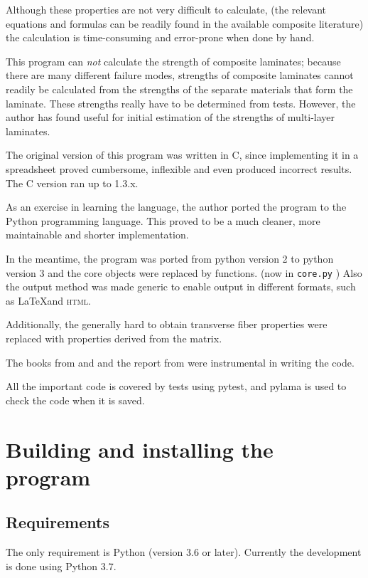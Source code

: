 \documentclass[a4paper,landscape,oneside,11pt,twocolumn]{memoir}
\begin{document}
Although these properties are not very difficult to calculate, (the relevant
equations and formulas can be readily found in the available composite
literature) the calculation is time-consuming and error-prone when done by
hand.

This program can \emph{not} calculate the strength of composite laminates;
because there are many different failure modes, strengths of composite
laminates cannot readily be calculated from the strengths of the separate
materials that form the laminate. These strengths really have to be determined from
tests. However, the author has found \citet{1992WeiEn..52...29H} useful for
initial estimation of the strengths of multi-layer laminates.

The original version of this program was written in C, since implementing
it in a spreadsheet proved cumbersome, inflexible and even produced
incorrect results. The C version ran up to 1.3.x.

As an exercise in learning the language, the author ported the program to
the Python programming language. This proved to be a much cleaner, more
maintainable and shorter implementation.

In the meantime, the program was ported from python version 2 to python
version 3 and the core objects were replaced by functions. (now in
\texttt{core.py} ) Also the output method was made generic to enable output in
different formats, such as \LaTeX and \textsc{html}.

Additionally, the generally hard to obtain transverse fiber properties
were replaced with properties derived from the matrix.

The books from \citet{Hyer:1998} and \citet{Tsai:1992} and the report from
\citet{Nettles:1994} were instrumental in writing the code.

All the important code is covered by tests using pytest, and pylama is used to
check the code when it is saved.

\chapter{Building and installing the program} %

\section{Requirements} %

The only requirement is Python (version 3.6 or later). Currently the
development is done using Python 3.7.
\end{document}
